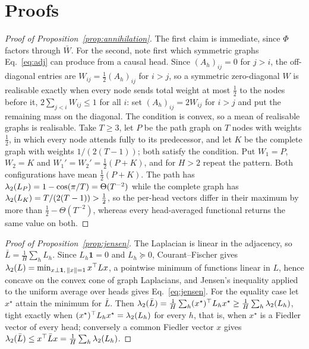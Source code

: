 \appendix
\section{Proofs}
\label{app:proofs}

\begin{proof}[Proof of Proposition~\ref{prop:annihilation}]
The first claim is immediate, since $\Phi$ factors through $\bar W$. For the second, note first which
symmetric graphs Eq.~\ref{eq:adj} can produce from a causal head. Since $(A_h)_{ij}=0$ for $j>i$, the
off-diagonal entries are $W_{ij}=\tfrac12(A_h)_{ij}$ for $i>j$, so a symmetric zero-diagonal $W$ is realisable
exactly when every node sends total weight at most $\tfrac12$ to the nodes before it, $2\sum_{j<i}W_{ij}\le 1$
for all $i$: set $(A_h)_{ij}=2W_{ij}$ for $i>j$ and put the remaining mass on the diagonal. The condition is
convex, so a mean of realisable graphs is realisable. Take $T\ge 3$, let $P$ be the path graph on $T$ nodes
with weights $\tfrac12$, in which every node attends fully to its predecessor, and let $K$ be the complete
graph with weights $1/(2(T-1))$; both satisfy the condition. Put $W_1=P$, $W_2=K$ and
$W_1'=W_2'=\tfrac12(P+K)$, and for $H>2$ repeat the pattern. Both configurations have mean $\tfrac12(P+K)$.
The path has $\lambda_{2}(L_P)=1-\cos(\pi/T)=\Theta(T^{-2})$ while the complete graph has
$\lambda_{2}(L_K)=T/(2(T-1))>\tfrac12$, so the per-head vectors differ in their maximum by more than
$\tfrac12-\Theta(T^{-2})$, whereas every head-averaged functional returns the same value on both.
\end{proof}

\begin{proof}[Proof of Proposition~\ref{prop:jensen}]
The Laplacian is linear in the adjacency, so $\bar L=\frac1H\sum_h L_h$. Since $L_h\mathbf{1}=0$ and
$L_h\succeq 0$, Courant--Fischer gives $\lambda_{2}(L)=\min_{x\perp\mathbf{1},\,\|x\|=1}x^{\top}Lx$, a pointwise
minimum of functions linear in $L$, hence concave on the convex cone of graph Laplacians, and Jensen's
inequality applied to the uniform average over heads gives Eq.~\ref{eq:jensen}. For the equality case let
$x^\star$ attain the minimum for $\bar L$. Then
$\lambda_{2}(\bar L)=\frac1H\sum_h(x^\star)^{\top}L_hx^\star\ge\frac1H\sum_h\lambda_{2}(L_h)$, tight exactly when
$(x^\star)^{\top}L_hx^\star=\lambda_{2}(L_h)$ for every $h$, that is, when $x^\star$ is a Fiedler vector of every
head; conversely a common Fiedler vector $x$ gives $\lambda_{2}(\bar L)\le x^\top\bar L x=\frac1H\sum_h\lambda_{2}(L_h)$.
\end{proof}

